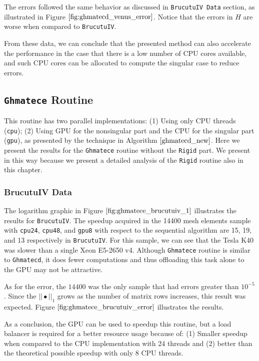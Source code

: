 The errors followed the same behavior as discussed in \texttt{BrucutuIV Data} section, as illustrated in 
Figure $\ref{fig:ghmatecd_venus_error}$. Notice that the errors in $H$ are worse when compared to
\texttt{BrucutuIV}.

From these data, we can conclude that the presented method can also accelerate the performance in 
the case that there is a low number of CPU cores available, and such CPU cores can be allocated to 
compute the singular case to reduce errors. 

\subsection{\texttt{Ghmatece} Routine}

This routine has two parallel implementations: (1) Using only CPU threads (\texttt{cpu}); 
(2) Using GPU for the nonsingular part and the CPU for the singular part (\texttt{gpu}), 
as presented by the technique in Algorithm $\ref{ghmatecd_new}$. Here we present the results 
for the \texttt{Ghmatece} routine without the \texttt{Rigid} part. We present in this way because we present 
a detailed analysis of the \texttt{Rigid} routine also in this chapter.

\subsubsection{BrucutuIV Data}

The logarithm graphic in Figure $\ref{fig:ghmatece_brucutuiv_1}$ illustrates the results 
for \texttt{BrucutuIV}. The speedup acquired in the 14400 mesh elements sample with 
\texttt{cpu24}, \texttt{cpu48}, and \texttt{gpu8} with respect to the sequential algorithm 
are 15, 19, and 13 respectively in \texttt{BrucutuIV}. For this sample, we can see that 
the Tesla K40 was slower than a single Xeon E5-2650 v4. Although \texttt{Ghmatece} 
routine is similar to \texttt{Ghmatecd}, it does fewer computations and thus offloading 
this task alone to the GPU may not be attractive.

As for the error, the $14400$ was the only sample that had errors greater than $10^{-5}$. Since the $||\bullet||_1$
grows as the number of matrix rows increases, this result was expected. Figure $\ref{fig:ghmatece_brucutuiv_error}$
illustrates the results.

As a conclusion, the GPU can be used to speedup this routine, but a load balancer is required for a 
better resource usage because of: (1) Smaller speedup when compared to the CPU implementation with 
24 threads and (2) better than the theoretical possible speedup with only 8 CPU threads. 

